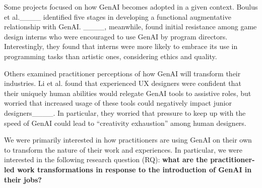 Some projects focused on how GenAI becomes adopted in a given context. Boulus et al.____ identified five stages in developing a functional augmentative relationship with GenAI.
____, meanwhile, found initial resistance among game design interns who were encouraged to use GenAI by program directors. Interestingly, they found that interns were more likely to embrace its use in programming tasks than artistic ones, considering ethics and quality.

Others examined practitioner perceptions of how GenAI will transform their industries.
Li et al. found that experienced UX designers were confident that their uniquely human abilities would relegate GenAI tools to assistive roles, but worried that increased usage of these tools could negatively impact junior designers____. In particular, they worried that pressure to keep up with the speed of GenAI  could lead to ``creativity exhaustion'' among human designers. 

We were primarily interested in how practitioners are using GenAI on their own to transform the nature of their work and experiences. In particular, we were interested in the following research question (RQ): \textbf{what are the practitioner-led work transformations in response to the introduction of GenAI in their jobs?}


